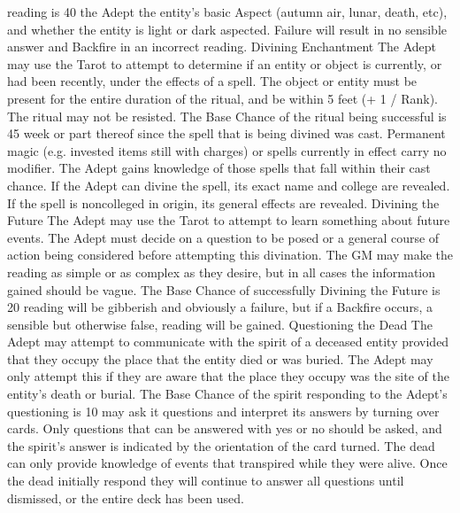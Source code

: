 \documentclass[a4paper]{article}
\begin{document}
\begin{multicols}{3}
reading is 40%
the Adept the entity’s basic Aspect (autumn air,
lunar, death, etc), and whether the entity is light or
dark aspected. Failure will result in no sensible
answer and Backfire in an incorrect reading.
Divining Enchantment The Adept may use the
Tarot to attempt to determine if an entity or object
is currently, or had been recently, under the effects
of a spell. The object or entity must be present for
the entire duration of the ritual, and be within 5
feet (+ 1 / Rank). The ritual may not be resisted.
The Base Chance of the ritual being successful is
45%
week or part thereof since the spell that is being
divined was cast. Permanent magic (e.g. invested
items still with charges) or spells currently in effect
carry no modifier. The Adept gains knowledge of
those spells that fall within their cast chance.
If the Adept can divine the spell, its exact name
and college are revealed. If the spell is noncolleged in origin, its general effects are revealed.
Divining the Future The Adept may use the Tarot
to attempt to learn something about future events.
The Adept must decide on a question to be posed
or a general course of action being considered
before attempting this divination. The GM may
make the reading as simple or as complex as they
desire, but in all cases the information gained
should be vague.
The Base Chance of successfully Divining the
Future is 20%
reading will be gibberish and obviously a failure,
but if a Backfire occurs, a sensible but otherwise
false, reading will be gained.
Questioning the Dead The Adept may attempt to
communicate with the spirit of a deceased entity
provided that they occupy the place that the entity
died or was buried. The Adept may only attempt
this if they are aware that the place they occupy
was the site of the entity’s death or burial. The
Base Chance of the spirit responding to the Adept’s
questioning is 10%
may ask it questions and interpret its answers by
turning over cards. Only questions that can be
answered with yes or no should be asked, and the
spirit’s answer is indicated by the orientation of the
card turned. The dead can only provide knowledge
of events that transpired while they were alive.
Once the dead initially respond they will continue
to answer all questions until dismissed, or the
entire deck has been used.


\end{multicols}
\end{document}
